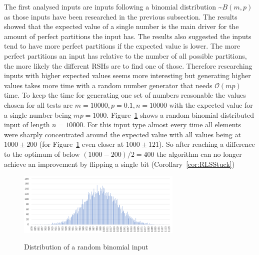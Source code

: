 The first analysed inputs are inputs following a binomial distribution \textasciitilde$B(m,p)$ as those inputs have been researched in the previous subsection.
The results showed that the expected value of a single number is the main driver for the amount of perfect partitions the input has.
The results also suggested the inputs tend to have more perfect partitions if the expected value is lower.
The more perfect partitions an input has relative to the number of all possible partitions, the more likely the different RSHs are to find one of those.
Therefore researching inputs with higher expected values seems more interesting but generating higher values takes more time with a random number generator that needs $\mathcal{O}(mp)$ time.
To keep the time for generating one set of numbers reasonable the values chosen for all tests are $m=10000, p=0.1, n=10000$ with the expected value for a single number being $mp=1000$.
Figure~\ref{fig:binDistExample} shows a random binomial distributed input of length $n=10000$.
For this input type almost every time all elements were sharply concentrated around the expected value with all values being at $1000\pm200$ (for Figure~\ref{fig:binDistExample} even closer at $1000\pm121$).
So after reaching a difference to the optimum of below $(1000-200)/2=400$ the algorithm can no longer achieve an improvement by flipping a single bit (Corollary~\ref{cor:RLSStuck})

\begin{figure}[h]
      \caption{Distribution of a random binomial input}
      \centering
      \includegraphics[width=0.7\textwidth]{figures/images/numberGenerator/binomialDistributionForN10000p0_1.png}\label{fig:binDistExample}
\end{figure}
